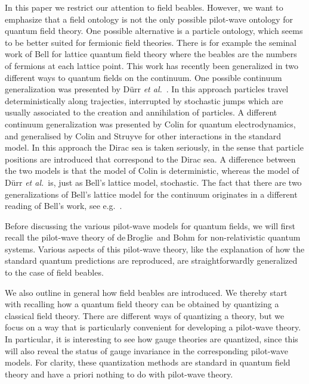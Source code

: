 \documentclass[12pt]{article}
\newcommand{\db}{de$\,$Broglie}
\begin{document}
In this paper we restrict our attention to field beables. However, we want to emphasize that a field ontology is not the only possible pilot-wave ontology for quantum field theory. One possible alternative is a particle ontology, which seems to be better suited for fermionic field theories. There is for example the seminal work of Bell \cite{bell87b} for lattice quantum field theory where the beables are the numbers of fermions at each lattice point. This work has recently been generalized in two different ways to quantum fields on the continuum. One possible continuum generalization was presented by D\"urr {\em et al.}\ \cite{durr02,durr031,durr032,tumulka03,durr04}. In this approach particles travel deterministically along trajecties, interrupted by stochastic jumps which are usually associated to the creation and annihilation of particles. A different continuum generalization was presented by Colin \cite{colin031,colin032,colin033} for quantum electrodynamics, and generalised by Colin and Struyve \cite{colin07} for other interactions in the standard model. In this approach the Dirac sea is taken seriously, in the sense that particle positions are introduced that correspond to the Dirac sea. A difference between the two models is that the model of Colin is deterministic, whereas the model of D\"urr {\em et al.}\ is, just as Bell's lattice model, stochastic. The fact that there are two generalizations of Bell's lattice model for the continuum originates in a different reading of Bell's work, see e.g.\ \cite{tumulka06,colin07}. 

Before discussing the various pilot-wave models for quantum fields, we will first recall the pilot-wave theory of \db\ and Bohm for non-relativistic quantum systems. Various aspects of this pilot-wave theory, like the explanation of how the standard quantum predictions are reproduced, are straightforwardly generalized to the case of field beables. 

We also outline in general how field beables are introduced. We thereby start with recalling how a quantum field theory can be obtained by quantizing a classical field theory. There are different ways of quantizing a theory, but we focus on a way that is particularly convenient for developing a pilot-wave theory. In particular, it is interesting to see how gauge theories are quantized, since this will also reveal the status of gauge invariance in the corresponding pilot-wave models. For clarity, these quantization methods are standard in quantum field theory and have a priori nothing to do with pilot-wave theory. 
\end{document}
